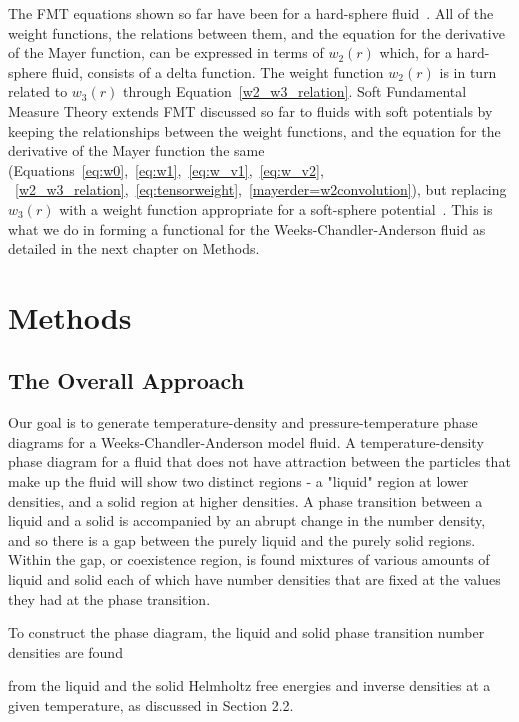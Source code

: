 \documentclass[double,12pt]{beavtex}
\begin{document}
The FMT equations shown so far have been for a hard-sphere fluid~\cite{Hansen}.
All of the weight functions, the relations between them, and the equation 
for the derivative of the Mayer function, can be expressed in terms of 
$w_{2}(r)$ which, for a hard-sphere fluid, consists of a delta function.
The weight function $w_{2}(r)$ is in turn related to $w_{3}(r)$ through 
Equation~\ref{w2_w3_relation}.
Soft Fundamental Measure Theory extends FMT discussed so far to fluids 
with soft potentials by keeping the relationships between the weight 
functions, and the equation for the derivative of the Mayer function 
the same (Equations~\ref{eq:w0},~\ref{eq:w1},~\ref{eq:w_v1},~\ref{eq:w_v2},
~\ref{w2_w3_relation},~\ref{eq:tensorweight},~\ref{mayerder=w2convolution}), 
but replacing $w_{3}(r)$ with a weight function appropriate 
for a soft-sphere potential~\cite{schmidt1999density, schmidt2000fluid}. 
This is what we do in forming a functional for the Weeks-Chandler-Anderson 
fluid as detailed in the next chapter on Methods.

\chapter{Methods}

\section{The Overall Approach}
  
Our goal is to generate temperature-density and pressure-temperature 
phase diagrams for a Weeks-Chandler-Anderson model fluid. 
A temperature-density phase diagram for a fluid that does not
have attraction between the particles that make up the fluid will show
two distinct regions - a "liquid" region at lower densities, and a solid 
region at higher densities. 
A phase transition between a liquid and a solid is accompanied by an 
abrupt change in the number density, and so there is a gap between the 
purely liquid and the purely solid regions. Within the gap, or coexistence
region, is found mixtures of various amounts of liquid and solid each of
which have number densities that are fixed at the values they had at the 
phase transition. 

To construct the phase diagram, the liquid and solid phase transition number densities
are found 


from the liquid and the solid Helmholtz 
free energies and inverse densities at a given temperature, as
discussed in Section 2.2. 
\end{document}
